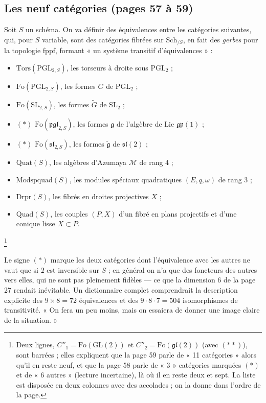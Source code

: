 \documentclass[11pt,a4paper]{article}
\begin{document}
\subsection*{Les neuf catégories (pages 57 à 59)}

Soit $S$ un schéma. On va définir des équivalences entre les catégories
suivantes, qui, pour $S$ variable, sont des catégories fibrées sur
$\mathrm{Sch}_{/S}$, en fait des \emph{gerbes} pour la topologie fppf, formant « un
système transitif d'équivalences » :
\begin{itemize}
  \item[$C_0$] $\mathrm{Tors}(\mathrm{PGL}_{2,S})$, les torseurs à droite sous $\mathrm{PGL}_2$ ;
  \item[$C_1$] $\mathrm{Fo}(\mathrm{PGL}_{2,S})$, les formes $G$ de $\mathrm{PGL}_2$ ;
  \item[$C'_1$] $\mathrm{Fo}(\mathrm{SL}_{2,S})$, les formes $\widetilde{G}$ de $\mathrm{SL}_2$ ;
  \item[$C_2$] $(*)$ $\mathrm{Fo}(\mathfrak{pgl}_{2,S})$, les formes $\mathfrak{g}$ de
    l'algèbre de Lie $\mathfrak{gp}(1)$ ;
  \item[$C'_2$] $(*)$ $\mathrm{Fo}(\mathfrak{sl}_{2,S})$, les formes $\widetilde{\mathfrak{g}}$ de
    $\mathfrak{sl}(2)$ ;
  \item[$C_3$] $\mathrm{Quat}(S)$, les algèbres d'Azumaya $\mathcal{M}$ de rang $4$ ;
  \item[$C_4$] $\mathrm{Modspquad}(S)$, les modules spéciaux quadratiques
    $(E, q, \omega)$ de rang $3$ ;
  \item[$C_5$] $\mathrm{Drpr}(S)$, les fibrés en droites projectives $X$ ;
  \item[$C'_5$] $\mathrm{Quad}(S)$, les couples $(P, X)$ d'un fibré en plans projectifs
    et d'une conique lisse $X \subset P$.
\end{itemize}
\footnote{Deux lignes, $C''_1 = \mathrm{Fo}(\mathrm{GL}(2))$ et
$C''_2 = \mathrm{Fo}(\mathfrak{gl}(2))$ (avec $(**)$), sont barrées ; elles expliquent
que la page 59 parle de « 11 catégories » alors qu'il en reste neuf, et que la
page 58 parle de « 3 » catégories marquées $(*)$ et de « 6 autres » (lecture
incertaine), là où il en reste deux et sept. La liste est disposée en deux
colonnes avec des accolades ; on la donne dans l'ordre de la page.}

Le signe $(*)$ marque les deux catégories dont l'équivalence avec les autres ne
vaut que si $2$ est inversible sur $S$ ; en général on n'a que des foncteurs des
autres vers elles, qui ne sont pas pleinement fidèles — ce que la dimension $6$
de la page 27 rendait inévitable. Un dictionnaire complet comprendrait la
description explicite des $9 \times 8 = 72$ équivalences et des $9 \cdot 8 \cdot 7 =
504$ isomorphismes de transitivité. « On fera un peu moins, mais on essaiera de
donner une image claire de la situation. »
\end{document}
